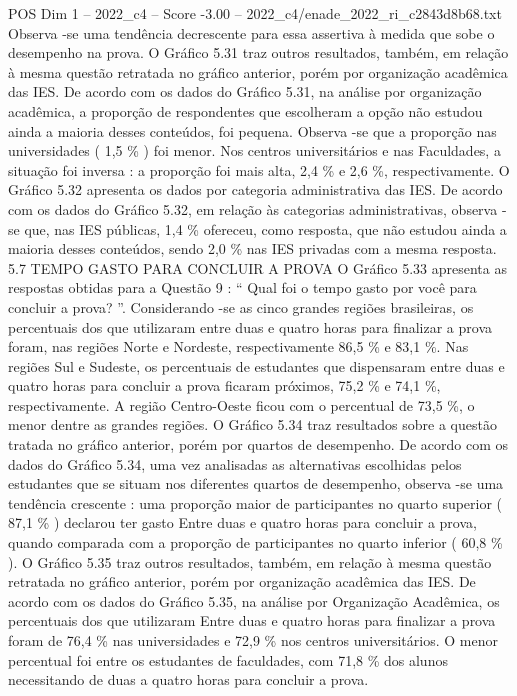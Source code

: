 \begin{textsample}{POS Dim 1 – 2022\_c4 – Score -3.00 – 2022\_c4/enade\_2022\_ri\_c2843d8b68.txt}
Observa -se uma tendência decrescente para essa assertiva à medida que sobe o desempenho na prova.
O Gráfico 5.31 traz outros resultados, também, em relação à mesma questão retratada no gráfico anterior, porém por organização acadêmica das IES.
De acordo com os dados do Gráfico 5.31, na análise por organização acadêmica, a proporção de respondentes que escolheram a opção não estudou ainda a maioria desses conteúdos, foi pequena.
Observa -se que a proporção nas universidades ( 1,5 \% ) foi menor.
Nos centros universitários e nas Faculdades, a situação foi inversa : a proporção foi mais alta, 2,4 \% e 2,6 \%, respectivamente.
O Gráfico 5.32 apresenta os dados por categoria administrativa das IES.
De acordo com os dados do Gráfico 5.32, em relação às categorias administrativas, observa -se que, nas IES públicas, 1,4 \% ofereceu, como resposta, que não estudou ainda a maioria desses conteúdos, sendo 2,0 \% nas IES privadas com a mesma resposta. 5.7 TEMPO GASTO PARA CONCLUIR A PROVA O Gráfico 5.33 apresenta as respostas obtidas para a Questão 9 : “ Qual foi o tempo gasto por você para concluir a prova? ”.
Considerando -se as cinco grandes regiões brasileiras, os percentuais dos que utilizaram entre duas e quatro horas para finalizar a prova foram, nas regiões Norte e Nordeste, respectivamente 86,5 \% e 83,1 \%.
Nas regiões Sul e Sudeste, os percentuais de estudantes que dispensaram entre duas e quatro horas para concluir a prova ficaram próximos, 75,2 \% e 74,1 \%, respectivamente.
A região Centro-Oeste ficou com o percentual de 73,5 \%, o menor dentre as grandes regiões.
O Gráfico 5.34 traz resultados sobre a questão tratada no gráfico anterior, porém por quartos de desempenho.
De acordo com os dados do Gráfico 5.34, uma vez analisadas as alternativas escolhidas pelos estudantes que se situam nos diferentes quartos de desempenho, observa -se uma tendência crescente : uma proporção maior de participantes no quarto superior ( 87,1 \% ) declarou ter gasto Entre duas e quatro horas para concluir a prova, quando comparada com a proporção de participantes no quarto inferior ( 60,8 \% ).
O Gráfico 5.35 traz outros resultados, também, em relação à mesma questão retratada no gráfico anterior, porém por organização acadêmica das IES.
De acordo com os dados do Gráfico 5.35, na análise por Organização Acadêmica, os percentuais dos que utilizaram Entre duas e quatro horas para finalizar a prova foram de 76,4 \% nas universidades e 72,9 \% nos centros universitários.
O menor percentual foi entre os estudantes de faculdades, com 71,8 \% dos alunos necessitando de duas a quatro horas para concluir a prova.

\end{textsample}
